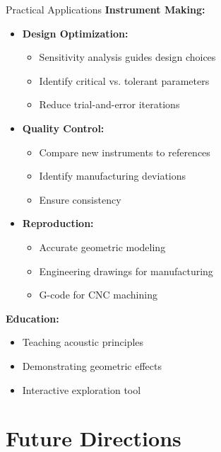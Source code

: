 \documentclass[aspectratio=169,10pt]{beamer}
\begin{document}
\begin{frame}{Practical Applications}
\textbf{Instrument Making:}

\begin{itemize}
    \item \textbf{Design Optimization:}
    \begin{itemize}
        \item Sensitivity analysis guides design choices
        \item Identify critical vs. tolerant parameters
        \item Reduce trial-and-error iterations
    \end{itemize}
    
    \item \textbf{Quality Control:}
    \begin{itemize}
        \item Compare new instruments to references
        \item Identify manufacturing deviations
        \item Ensure consistency
    \end{itemize}
    
    \item \textbf{Reproduction:}
    \begin{itemize}
        \item Accurate geometric modeling
        \item Engineering drawings for manufacturing
        \item G-code for CNC machining
    \end{itemize}
\end{itemize}

\textbf{Education:}
\begin{itemize}
    \item Teaching acoustic principles
    \item Demonstrating geometric effects
    \item Interactive exploration tool
\end{itemize}
\end{frame}

\section{Future Directions}
\end{document}
